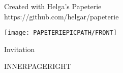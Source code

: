 \documentclass[a5paper,landscape]{scrartcl}
\begin{document}
\begin{multicols}{2}

\begin{center}

\vspace*{\fill}

{\color{grey}\tiny{} Created with Helga's Papeterie\\ https://github.com/helgar/papeterie \par }
\end{center}

\columnbreak

  \begin{center}
    \centering\texttt{[image: PAPETERIEPICPATH/FRONT]}

    \vspace{1cm}

    {\huge\calligra Invitation}
  \end{center}

\end{multicols}

\pagebreak

\begin{multicols}{2}

  \begin{center}
    \vspace{5cm}
  \end{center}

\columnbreak

INNERPAGERIGHT

\end{multicols}
\end{document}
